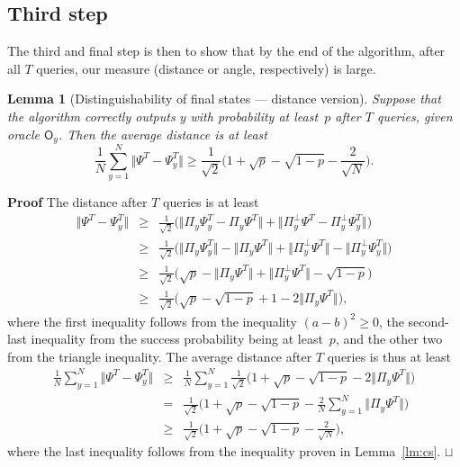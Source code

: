 \documentclass{article}
\newtheorem{lemma}[theorem]{Lemma}
\def\squareforqed{\hbox{\rlap{$\sqcap$}$\sqcup$}}
\def\qed{\ifmmode\squareforqed\else{\unskip\nobreak\hfil
\penalty50\hskip1em\null\nobreak\hfil\squareforqed
\parfillskip=0pt\finalhyphendemerits=0\endgraf}\fi}
\newenvironment{proof}{\begin{trivlist}\item[]{\flushleft\bf Proof }}
{\qed\end{trivlist}}
\newcommand{\op}[1]{\mathsf{#1}}
\newcommand{\proj}{\mathsf{\Pi}}
\begin{document}
\subsection{Third step}
The third and final step is then to show that by the end of the
algorithm, after all $T$ queries, our measure (distance or angle,
respectively) is large.

\begin{lemma}[Distinguishability of final states --- distance version]
\label{lm:final}
Suppose that the algorithm correctly outputs $y$ with probability at
least~$p$ after $T$ queries, given oracle $\op{O}_y$.  Then the
average distance is at least
\begin{equation}
  \frac{1}{N}\sum\limits_{y=1}^{N}
  \big\Vert \Psi^{T} - \Psi^{T}_{y}\big\Vert 
  \geq \frac{1}{\sqrt 2} \Big( 1 + \sqrt{p} - \sqrt{1-p} - \frac{2}{\sqrt N}\Big).
\end{equation}
\end{lemma}

\begin{proof}
  The distance after $T$ queries is at least
\begin{eqnarray*}
  \big\Vert \Psi^{T} - \Psi^{T}_{y} \big\Vert 
  &\geq& \frac{1}{\sqrt 2} \Big(
  \big\Vert \proj_y \Psi^T_{y} - \proj_y \Psi^T \big\Vert
  + \big\Vert \proj_y^{\perp} \Psi^T - \proj_y^{\perp} \Psi^T_{y} \big\Vert \Big) \\
  &\geq& \frac{1}{\sqrt 2} \Big(
    \big\Vert \proj_y \Psi^T_{y} \big\Vert 
  - \big\Vert \proj_y \Psi^T \big\Vert 
  + \big\Vert \proj_y^{\perp} \Psi^T \big\Vert 
  - \big\Vert \proj_y^{\perp} \Psi^T_{y} \big\Vert  \Big) \\
  &\geq& \frac{1}{\sqrt 2} \Big(
    \sqrt{p}
  - \big\Vert \proj_y \Psi^T \big\Vert 
  + \big\Vert \proj_y^{\perp} \Psi^T \big\Vert  
  - \sqrt{1-p} \Big)\\
  &\geq& \frac{1}{\sqrt 2} \Big(
    \sqrt{p}
  - \sqrt{1-p}
  + 1
  - 2 \big\Vert \proj_y \Psi^T \big\Vert  \Big),
\end{eqnarray*}
where the first inequality follows from the inequality $(a-b)^2 \geq
0$, the second-last inequality from the success probability being at
least~$p$, and the other two from the triangle inequality.  The
average distance after $T$ queries is thus at least
\begin{eqnarray*}
  \frac{1}{N}\sum\limits_{y=1}^{N} 
    \big\Vert \Psi^{T} - \Psi^{T}_{y} \big\Vert
  &\geq& \frac{1}{N}\sum\limits_{y=1}^{N} 
  \frac{1}{\sqrt 2} \Big( 1 + \sqrt{p} 
      - \sqrt{1-p} - 2 \big\Vert \proj_y \Psi^T \big\Vert \Big) \\
  &=&
  \frac{1}{\sqrt 2} \Big( 1 + \sqrt{p} - \sqrt{1-p} 
  - \frac{2}{N} \sum\limits_{y=1}^{N} 
    \big\Vert \proj_y \Psi^T \big\Vert \Big) \\
  &\geq&
  \frac{1}{\sqrt 2} \Big( 1 + \sqrt{p} - \sqrt{1-p} - \frac{2}{\sqrt N}\Big),
\end{eqnarray*}
where the last inequality follows from the inequality proven in
Lemma~\ref{lm:cs}.
\end{proof}
\end{document}
